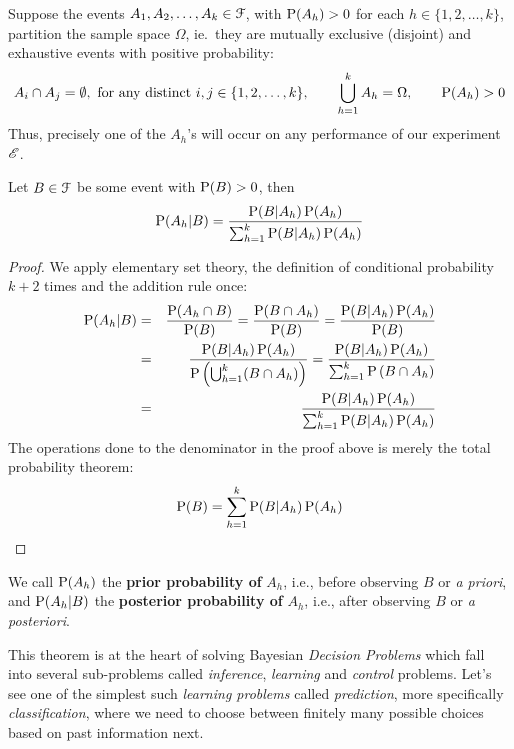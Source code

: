 \begin{framed}
\begin{prop}
 Suppose the events $A_1,A_2,\ldots,A_k \in \C{F}$, with $\P(A_h)>0$ for each $h \in \{1,2,\ldots,k\}$, partition the sample space $\Omega$, ie.~they are mutually exclusive (disjoint) and exhaustive events with positive probability: 
 \[
 A_i \cap A_j = \emptyset, \ \text{for any distinct $i,j \in \{1,2,\ldots,k\}$}, \qquad \bigcup_{h=1}^k A_h = \Omega, \qquad \P(A_h) > 0
 \]
 Thus, precisely one of the $A_h$'s will occur on any performance of our experiment $\EE{E}$.  
 
 Let $B \in \C{F}$ be some event with $\P(B) > 0$, then 
 \begin{equation}\label{E:BayesThm}
 \P(A_h|B) = \frac{\P(B|A_h) \P(A_h)}{\sum_{h=1}^k \P(B|A_h) \P(A_h)}
 \end{equation}
 \end{prop}
\end{framed}
 {\scriptsize
 \begin{proof}
 We apply elementary set theory, the definition of conditional probability $k+2$ times and the addition rule once:
 \begin{eqnarray}
 \P(A_h | B) &=& \frac{\P(A_h \cap B)}{\P(B)} = \frac{\P( B \cap A_h)}{\P(B)} = 
 \frac{\P( B | A_h) \P(A_h)}{\P(B)}  \notag \\
 &=& \frac{\P( B | A_h) \P(A_h)}{\P \left( \bigcup_{h=1}^k (B \cap A_h) \right)} =
 \frac{\P( B | A_h) \P(A_h)}{\sum_{h=1}^k \P \left( B \cap A_h \right)} \notag \\
 &=& \frac{\P( B | A_h) \P(A_h)}{\sum_{h=1}^k \P(B | A_h) \P(A_h)} \notag
 \end{eqnarray}
The operations done to the denominator in the proof above is merely the total probability theorem:
\begin{equation*}
\P( B) = \sum_{h=1}^k \P(B | A_h) \P(A_h)
\end{equation*}
 \end{proof}
}

We call $\P(A_h)$ the {\bf prior probability of} $A_h$, i.e., before observing $B$ or \emph{a priori}, and $\P(A_h|B)$ the {\bf posterior probability of} $A_h$, i.e., after observing $B$ or \emph{a posteriori}. 

This theorem is at the heart of solving Bayesian \emph{Decision Problems} which fall into several sub-problems called \emph{inference}, \emph{learning} and \emph{control} problems.
Let's see one of the simplest such \emph{learning problems} called \emph{prediction}, more specifically \emph{classification}, where we need to choose between finitely many possible choices based on past information next.

